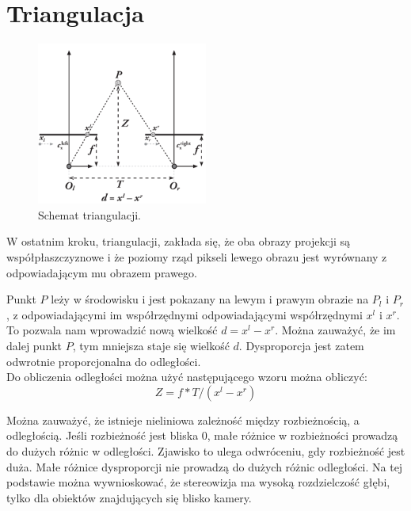 \documentclass[magisterska]{pracadypl}
\begin{document}
\section{Triangulacja}

\begin{figure}[H]  %
    \centering  %
    \includegraphics[width=0.5\textwidth]{images/triangulation.png}  %
    \captionsetup{font=footnotesize}
    \caption[Schemat triangulacji. Learning OpenCV 3, O'Reilly, Str. 705]{Schemat triangulacji.}
    \label{fig:rpi}  %
\end{figure}

W ostatnim kroku, triangulacji, zakłada się, że oba obrazy projekcji są współpłaszczyznowe i że poziomy rząd pikseli lewego obrazu jest wyrównany z odpowiadającym mu obrazem prawego.

Punkt $P$ leży w środowisku i jest pokazany na
lewym i prawym obrazie na $P_l$ i $P_r$, z odpowiadającymi im współrzędnymi
odpowiadającymi współrzędnymi $x^l$ i $x^r$. To pozwala nam wprowadzić nową wielkość $d = x^l - x^r$.
Można zauważyć, że im dalej punkt $P$, tym mniejsza staje się wielkość $d$. Dysproporcja jest zatem odwrotnie proporcjonalna do odległości.\\
Do obliczenia odległości można użyć następującego wzoru można obliczyć: \[Z=f*T/(x^l-x^r)\]

Można zauważyć, że istnieje nieliniowa zależność między rozbieżnością, a odległością.
Jeśli rozbieżność jest bliska 0, małe różnice w rozbieżności prowadzą do dużych różnic w odległości.
Zjawisko to ulega odwróceniu, gdy rozbieżność jest duża. Małe różnice dysproporcji nie prowadzą do dużych różnic odległości. Na tej podstawie można wywnioskować, że stereowizja ma wysoką rozdzielczość głębi, tylko dla obiektów znajdujących się blisko kamery.
\end{document}
